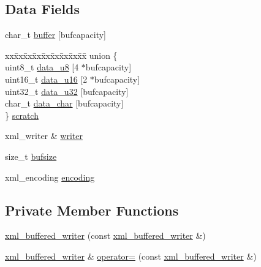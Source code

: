 \subsection*{Data Fields}
\begin{CompactItemize}
\item 
char\_\-t \hyperlink{classxml__buffered__writer_84c87765fbdf444d981ffb0f67899dd4}{buffer} \mbox{[}bufcapacity\mbox{]}
\item 
\begin{tabbing}
xx\=xx\=xx\=xx\=xx\=xx\=xx\=xx\=xx\=\kill
union \{\\
\>uint8\_t \hyperlink{classxml__buffered__writer_c672c70ba0597cf94d35c352ac563891}{data\_u8} \mbox{[}4 $\ast$bufcapacity\mbox{]}\\
\>uint16\_t \hyperlink{classxml__buffered__writer_a969d3724efe221a68927947e3a5196d}{data\_u16} \mbox{[}2 $\ast$bufcapacity\mbox{]}\\
\>uint32\_t \hyperlink{classxml__buffered__writer_fa54826d8227c4ee661e1a9cc1e1acf2}{data\_u32} \mbox{[}bufcapacity\mbox{]}\\
\>char\_t \hyperlink{classxml__buffered__writer_6f21e839a1c66901995c8aae5cc9ad7b}{data\_char} \mbox{[}bufcapacity\mbox{]}\\
\} \hyperlink{classxml__buffered__writer_99e9007c9af7b48a758adb0cbc55a147}{scratch}\\

\end{tabbing}\item 
xml\_\-writer \& \hyperlink{classxml__buffered__writer_37cdd45f867937e1978565f5a0fa318b}{writer}
\item 
size\_\-t \hyperlink{classxml__buffered__writer_6bad6a93035d796939d84bee30e74ce7}{bufsize}
\item 
xml\_\-encoding \hyperlink{classxml__buffered__writer_b810a7286598172e1549561b285f08fb}{encoding}
\end{CompactItemize}
\subsection*{Private Member Functions}
\begin{CompactItemize}
\item 
\hyperlink{classxml__buffered__writer_6ab927cae021733a4b2e9e7cbbb79c13}{xml\_\-buffered\_\-writer} (const \hyperlink{classxml__buffered__writer}{xml\_\-buffered\_\-writer} \&)
\item 
\hyperlink{classxml__buffered__writer}{xml\_\-buffered\_\-writer} \& \hyperlink{classxml__buffered__writer_0aab8cdf0db6269840a0b16319bdb985}{operator=} (const \hyperlink{classxml__buffered__writer}{xml\_\-buffered\_\-writer} \&)
\end{CompactItemize}


